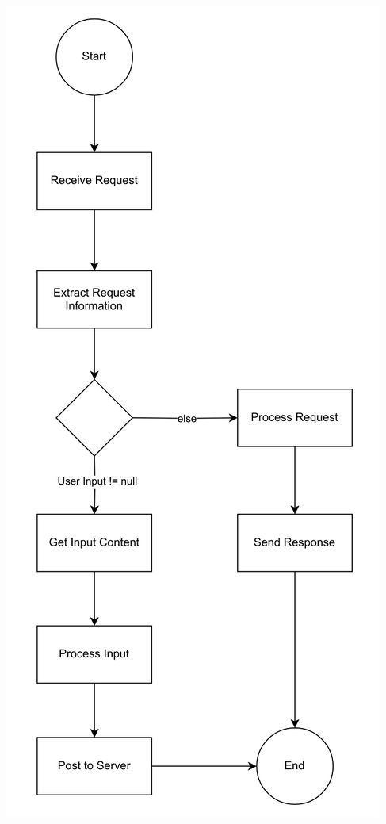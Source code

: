\documentclass[11pt]{article}
\begin{document}
\begin{enumerate}
\begin{itemize}
\begin{center}
						\includegraphics[scale=0.3]{post.png}
					\end{center}
					\pagebreak
				  

\end{itemize}
\end{enumerate}
\end{document}
